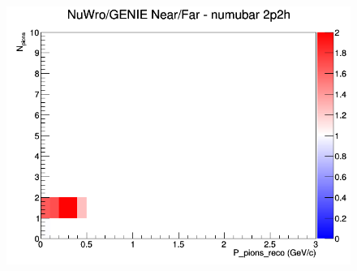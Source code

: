 \documentclass[12pt]{article}
\begin{document}
\begin{figure}[h]
\endminipage
{}
\includegraphics[width=\linewidth]{eff_N_P/FGT/pions/ratios/2p2h_NuWro_GENIE_numubar_NF_N_P.png}
\endminipage
\newline
\end{figure}
\clearpage
\end{document}
